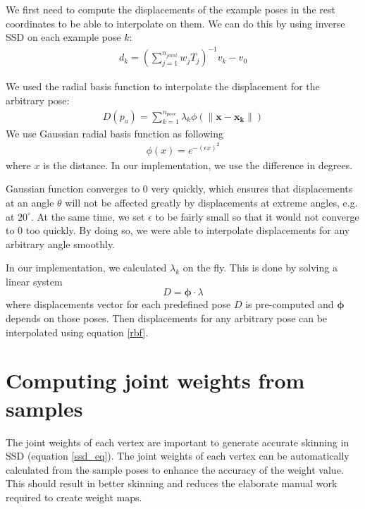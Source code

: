 \documentclass[11pt,twocolumn,letterpaper]{article}
\begin{document}
We first need to compute the displacements of the example poses in the rest coordinates to be able to interpolate on them. We can do this by using inverse SSD on each example pose $k$:
\begin{align} d_k = (\sum_{j=1}^{n_{joint}} w_j T_j)^{-1} v_k - v_0 \end{align}

We used the radial basis function \cite{lewis2000pose} to interpolate the displacement for the arbitrary pose:
\begin{align} D(p_a) = \sum_{k=1}^{n_{pose}} \lambda_k \phi(\| \mathbf{x} - \mathbf{x_k} \| ) 
\label{rbf}
\end{align}
We use Gaussian radial basis function as following
\begin{align} \phi(x) = e^{-(\epsilon x)^2} \end{align}
where $x$ is the distance. In our implementation, we use the difference in degrees.

Gaussian function converges to 0 very quickly, which ensures that displacements at an angle $\theta$ will not be affected greatly by displacements at extreme angles, e.g. at $20^{\circ}$. At the same time, we set $\epsilon$ to be fairly small so that it would not converge to 0 too quickly. By doing so, we were able to interpolate displacements for any arbitrary angle smoothly.

In our implementation, we calculated $\lambda_k$ on the fly. This is done by solving a linear system 
\begin{equation}
	D=\boldsymbol{\phi}\cdot\lambda
\end{equation} 
where displacements vector for each predefined pose $D$ is pre-computed and $\boldsymbol{\phi}$ depends on those poses. Then displacements for any arbitrary pose can be interpolated using equation \ref{rbf}.

\section{Computing joint weights from samples}
The joint weights of each vertex are important to generate accurate skinning in SSD (equation \ref{ssd_eq}). The joint weights of each vertex can be automatically calculated from the sample poses to enhance the accuracy of the weight value. This should result in better skinning and reduces the elaborate manual work required to create weight maps.
\end{document}
